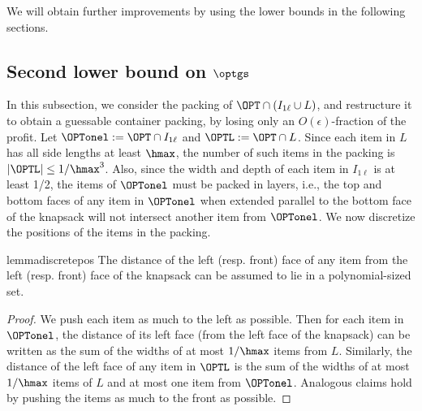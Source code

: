 

We will obtain further improvements by using the lower bounds in the following sections.
\subsection{Second lower bound on \texorpdfstring{$\optgs$}{optgs}}
\label{sec:secondlb}
In this subsection, we consider the packing of $\OPT\cap (I_{1\ell}\cup L)$, and restructure it to obtain a guessable container packing, by losing only an $O(\epsilon)$-fraction of the profit. 
Let $\OPTonel := \OPT\cap I_{1\ell}$ and $\OPTL := \OPT\cap L$. Since each item in $L$ has all side lengths at least $\hmax$, the number of such items in the packing is $|\OPTL| \le 1/\hmax^3$. 
Also, since the width and depth
of each item in $I_{1\ell}$ is at least 1/2, the items of $\OPTonel$ must be packed in layers, i.e., the top and bottom faces of any item in $\OPTonel$ when extended parallel to the bottom face of the knapsack will not intersect another item from $\OPTonel$. We now discretize the positions of the items in the packing.

\begin{restatable}{lemma}{discretepos}
\label{lem:discretepos}
    The distance of the left (resp. front) face of any item from the left (resp. front) face of the knapsack can be assumed to lie in a polynomial-sized set.
\end{restatable}
\begin{proof}
We push each item as much to the left as possible. Then for each item in $\OPTonel$, the distance of its left face (from the left face of the knapsack) can be written as the sum of the widths of at most $1/\hmax$ items from $L$. Similarly, the distance of the left face of any item in $\OPTL$ is the sum of the widths of at most $1/\hmax$ items of $L$ and at most one item from $\OPTonel$. Analogous claims hold by pushing the items as much to the front as possible.
\end{proof}


